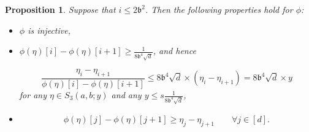 \documentclass[11pt,letterpaper]{article}
\newtheorem{proposition}[theorem]{Proposition}
\begin{document}
%


\begin{proposition} \label{prop_map_phi}
Suppose that  $ i \leq 2\mathfrak{b}^2$.
%
Then the following properties hold for $\phi$:
%
\begin{itemize}

\item $\phi$ is injective,

\item  $\phi(\eta)[i] -  \phi(\eta)[i+1]  \geq   \frac{1}{8\mathfrak{b}^4\sqrt{d}}$,  and hence  

\begin{equation}\label{eq_b5e}
\frac{\eta_{i} - \eta_{i+1}}{\phi(\eta)[i] -  \phi(\eta)[i+1]}  \leq  8\mathfrak{b}^4 \sqrt{d}  \times (\eta_{i} - \eta_{i+1}) =  8 \mathfrak{b}^4 \sqrt{d}  \times y
\end{equation}
%
  for any $\eta \in  S_3(a,b;y)$ and any $y \leq s\frac{1}{8\mathfrak{b}^4\sqrt{d} }$,

\item  \begin{equation}\label{eq_b4e}
\phi(\eta)[j] -  \phi(\eta)[j+1] \geq \eta_{j} - \eta_{j+1} \qquad \forall j \in [d].
\end{equation}
\end{itemize}

\end{proposition}
\end{document}
